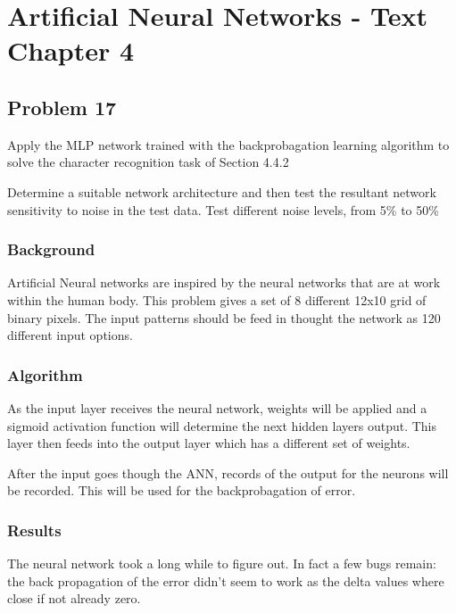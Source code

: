 
\chapter{Artificial Neural Networks - Text Chapter 4}
\section{Problem 17}
Apply the MLP network trained with the backprobagation learning algorithm to solve the character recognition task of Section 4.4.2

Determine a suitable network architecture and then test the resultant network sensitivity to noise in the test data.  Test different noise levels, from 5\% to 50\%

\subsection{Background}
Artificial Neural networks are inspired by the neural networks that are at work within the human body.  This problem gives a set of 8 different 12x10 grid of binary pixels.  The input patterns should be feed in thought the network as 120 different input options.


\subsection{Algorithm}
As the input layer receives the neural network, weights will be applied and a sigmoid activation function will determine the next hidden layers output.  This layer then feeds into the output layer which has a different set of weights.

After the input goes though the ANN, records of the output for the neurons will be recorded.  This will be used for the backprobagation of error.

\subsection{Results}
The neural network took a long while to figure out.  In fact a few bugs remain: the back propagation of the error didn't seem to work as the delta values where close if not already zero.




